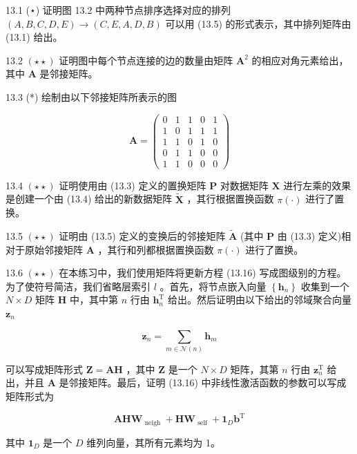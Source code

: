 \documentclass[10pt]{article}
\begin{document}
13.1 (⋆) 证明图 13.2 中两种节点排序选择对应的排列 \(\left( {A,B,C,D,E}\right)  \rightarrow  \left( {C,E,A,D,B}\right)\) 可以用 (13.5) 的形式表示，其中排列矩阵由 (13.1) 给出。

13.2 \(\left( {\star  \star  }\right)\) 证明图中每个节点连接的边的数量由矩阵 \({\mathbf{A}}^{2}\) 的相应对角元素给出，其中 \(\mathbf{A}\) 是邻接矩阵。

13.3 (*) 绘制由以下邻接矩阵所表示的图

\[
\mathbf{A} = \left( \begin{array}{lllll} 0 & 1 & 1 & 0 & 1 \\  1 & 0 & 1 & 1 & 1 \\  1 & 1 & 0 & 1 & 0 \\  0 & 1 & 1 & 0 & 0 \\  1 & 1 & 0 & 0 & 0 \end{array}\right)  \tag{13.42}
\]

13.4 \(\left( {\star  \star  }\right)\) 证明使用由 (13.3) 定义的置换矩阵 \(\mathbf{P}\) 对数据矩阵 \(\mathbf{X}\) 进行左乘的效果是创建一个由 (13.4) 给出的新数据矩阵 \(\widetilde{\mathbf{X}}\) ，其行根据置换函数 \(\pi \left( \cdot \right)\) 进行了置换。

13.5 \(\left( {\star  \star  }\right)\) 证明由 (13.5) 定义的变换后的邻接矩阵 \(\widetilde{\mathbf{A}}\) (其中 \(\mathbf{P}\) 由 (13.3) 定义)相对于原始邻接矩阵 \(\mathbf{A}\) ，其行和列都根据置换函数 \(\pi \left( \cdot \right)\) 进行了置换。

13.6 \(\left( {\star  \star  }\right)\) 在本练习中，我们使用矩阵将更新方程 (13.16) 写成图级别的方程。为了使符号简洁，我们省略层索引 \(l\) 。首先，将节点嵌入向量 \(\left\{  {\mathbf{h}}_{n}\right\}\) 收集到一个 \(N \times  D\) 矩阵 \(\mathbf{H}\) 中，其中第 \(n\) 行由 \({\mathbf{h}}_{n}^{\mathrm{T}}\) 给出。然后证明由以下给出的邻域聚合向量 \({\mathbf{z}}_{n}\)

\[
{\mathbf{z}}_{n} = \mathop{\sum }\limits_{{m \in  \mathcal{N}\left( n\right) }}{\mathbf{h}}_{m} \tag{13.43}
\]

可以写成矩阵形式 \(\mathbf{Z} = \mathbf{{AH}}\) ，其中 \(\mathbf{Z}\) 是一个 \(N \times  D\) 矩阵，其第 \(n\) 行由 \({\mathbf{z}}_{n}^{\mathrm{T}}\) 给出，并且 \(\mathbf{A}\) 是邻接矩阵。最后，证明 (13.16) 中非线性激活函数的参数可以写成矩阵形式为

\[
{\mathbf{{AHW}}}_{\text{ neigh }} + {\mathbf{{HW}}}_{\text{ self }} + {\mathbf{1}}_{D}{\mathbf{b}}^{\mathrm{T}} \tag{13.44}
\]

其中 \({\mathbf{1}}_{D}\) 是一个 \(D\) 维列向量，其所有元素均为 1。
\end{document}
